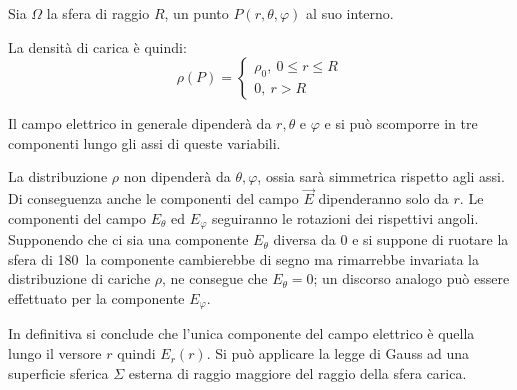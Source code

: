 Sia $\Omega$ la sfera di raggio $R$, un punto $P(r,\theta,\varphi)$ al suo interno.

La densità di carica è quindi:
$$
\rho(P) = 
\begin{cases}
\rho_0,\ 0\leq r\leq R\\
0,\ r > R
\end{cases}
$$

Il campo elettrico in generale dipenderà da $r,\theta$ e $\varphi$ e si può scomporre in 
tre componenti lungo gli assi di queste variabili.

La distribuzione $\rho$ non dipenderà da $\theta,\varphi$, ossia sarà simmetrica rispetto agli assi.
Di conseguenza anche le componenti del campo $\vec{E}$ dipenderanno solo da $r$.
Le componenti del campo $E_\theta$ ed $E_\varphi$ seguiranno le rotazioni dei rispettivi angoli.
Supponendo che ci sia una componente $E_\theta$ diversa da 0 e si suppone di ruotare la sfera di
180\textdegree\ la componente cambierebbe di segno ma rimarrebbe invariata la distribuzione di cariche $\rho$,
ne consegue che $E_\theta = 0$; un discorso analogo può essere effettuato per la componente $E_\varphi$.

In definitiva si conclude che l'unica componente del campo elettrico è quella lungo 
il versore $r$ quindi $E_r(r)$.
Si può applicare la legge di Gauss ad una superficie sferica $\Sigma$ esterna di raggio maggiore del raggio
della sfera carica.

